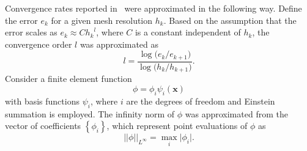 \documentclass[fleqn]{wlscirep}
\newcommand{\normlinf}[1]{{\vert\vert#1\vert\vert}_{L^{\infty}}}
\newcommand{\xx}{\bm{x}}
\begin{document}
Convergence rates reported in~ were
approximated in the following way. Define the error $e_k$ for a given mesh
resolution $h_k$. Based on the assumption that the error scales as
$e_k \approx C{h_k}^l$, where $C$ is a constant independent of $h_k$,
the convergence order $l$ was approximated as
\begin{equation}
    l = \frac{\log{(e_k/e_{k+1}})}{\log{(h_k/h_{k+1}})}.
    \label{eq:convergence_order_estimate}
\end{equation}
Consider a finite element function 
\begin{equation*}
    \phi = \phi_i\psi_i(\xx)
\end{equation*}
with basis functions $\psi_i$, where $i$ are the degrees of freedom and Einstein summation is employed.
The infinity norm of $\phi$ was approximated from the vector
of coefficients $\left\{\phi_i\right\}$, which represent point evaluations of $\phi$ as
\begin{equation*}
    \normlinf{\phi} = \max_i{\vert \phi_i\vert}.
\end{equation*}
\end{document}
